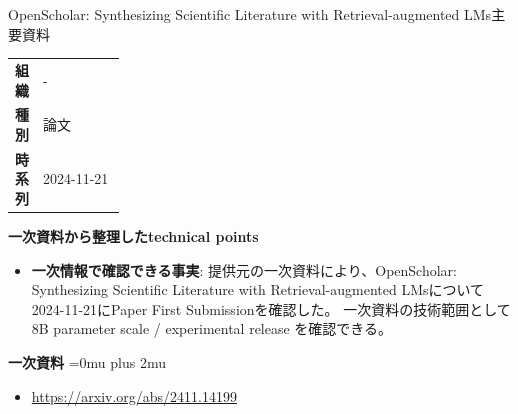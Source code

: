 \begin{technicalnote}{OpenScholar: Synthesizing Scientific Literature with Retrieval-augmented LMs}{主要資料}
\begingroup
\begin{tabularx}{\linewidth}{@{}>{\bfseries}p{0.22\linewidth}X@{}}
組織 & - \\
種別 & 論文 \\
時系列 & 2024-11-21 \\
\end{tabularx}
\smallskip
{\bfseries 一次資料から整理したtechnical points}
\begin{itemize}[leftmargin=1.5em,itemsep=0.35em]
\item \textbf{一次情報で確認できる事実}: 提供元の一次資料により、OpenScholar: Synthesizing Scientific Literature with Retrieval-augmented LMsについて2024-11-21にPaper First Submissionを確認した。 一次資料の技術範囲として 8B parameter scale / experimental release を確認できる。
\end{itemize}
\begin{minipage}{\linewidth}
\begin{samepage}
{\bfseries 一次資料}
\begingroup\sloppy
\Urlmuskip=0mu plus 2mu\relax
\begin{itemize}[leftmargin=1.5em,itemsep=0.25em]
\item {\scriptsize\url{https://arxiv.org/abs/2411.14199}}
\end{itemize}
\endgroup
\end{samepage}
\end{minipage}
\endgroup
\end{technicalnote}
\medskip

